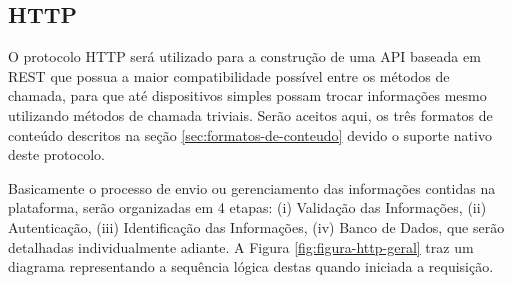         \subsection{HTTP}
        \label{sec:aquisicao-http}
        O protocolo \gls{HTTP} será utilizado para a construção de uma \gls{API} baseada em \gls{REST} que possua a maior compatibilidade possível entre os métodos de chamada, para que até dispositivos simples possam trocar informações mesmo utilizando métodos de chamada triviais. Serão aceitos aqui, os três formatos de conteúdo descritos na seção \ref{sec:formatos-de-conteudo} devido o suporte nativo deste protocolo.
        
        Basicamente o processo de envio ou gerenciamento das informações contidas na plataforma, serão organizadas em 4 etapas: (i) Validação das Informações, (ii) Autenticação, (iii) Identificação das Informações, (iv) Banco de Dados, que serão detalhadas individualmente adiante. A Figura \ref{fig:figura-http-geral} traz um diagrama representando a sequência lógica destas quando iniciada a requisição.
        
        \begin{figure}[!h]
    	\end{figure}
    	
    	\begin{figure}[!h]
    	\end{figure}
    	
